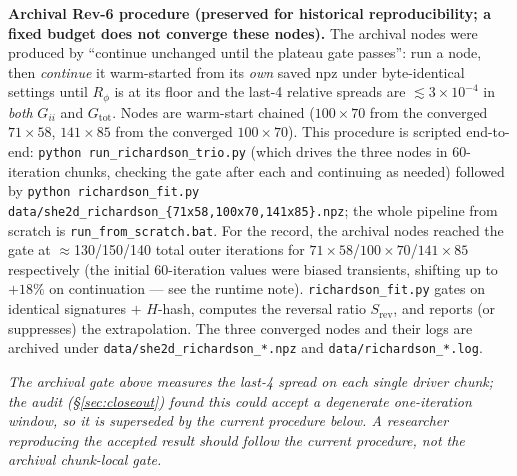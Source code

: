 \documentclass[11pt]{article}
\begin{document}
\textbf{Archival Rev-6 procedure (preserved for historical reproducibility; a fixed budget does not
converge these nodes).} The archival nodes were produced by ``continue unchanged until the plateau gate passes'':
run a node, then \emph{continue} it warm-started from its \emph{own} saved npz under byte-identical
settings until $R_\phi$ is at its floor and the last-4 relative spreads are $\lesssim3\times10^{-4}$
in \emph{both} $G_{ii}$ and $G_{\mathrm{tot}}$. Nodes are warm-start chained
($100\times70$ from the converged $71\times58$, $141\times85$ from the converged $100\times70$). This
procedure is scripted end-to-end: \texttt{python run\_richardson\_trio.py} (which drives the three
nodes in 60-iteration chunks, checking the gate after each and continuing as needed) followed by
\texttt{python richardson\_fit.py data/she2d\_richardson\_\{71x58,100x70,141x85\}.npz}; the whole
pipeline from scratch is \texttt{run\_from\_scratch.bat}. For the record, the archival nodes reached
the gate at $\approx$130/150/140 total outer iterations for $71\times58$/$100\times70$/$141\times85$
respectively (the initial 60-iteration values were biased transients, shifting up to $+18\%$ on
continuation --- see the runtime note). \texttt{richardson\_fit.py} gates on identical signatures
$+$ $H$-hash, computes the reversal ratio $S_{\mathrm{rev}}$, and reports (or suppresses) the
extrapolation. The three converged nodes and their logs are archived under
\texttt{data/she2d\_richardson\_*.npz} and \texttt{data/richardson\_*.log}.

\emph{The archival gate above measures the last-4 spread on each single driver chunk; the audit
(\S\ref{sec:closeout}) found this could accept a degenerate one-iteration window, so it is superseded
by the current procedure below. A researcher reproducing the accepted result should follow the current
procedure, not the archival chunk-local gate.}
\end{document}

